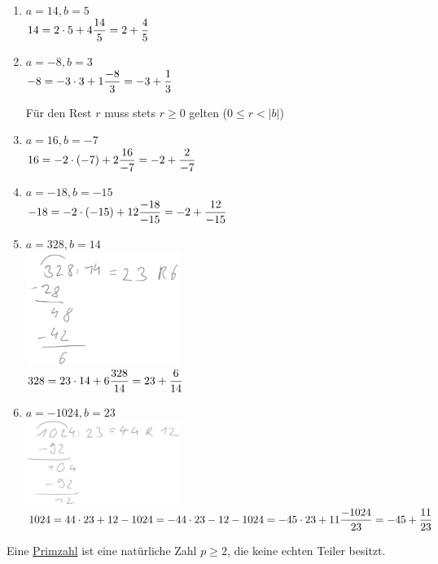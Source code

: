\Bsps
\begin{enumerate}
	\item $a=14,b=5$\\
	$14=2\cdot 5+4\hfil \dfrac{14}{5} = 2+\dfrac{4}{5}$
	
	\item $a=-8, b=3$\\
	$-8=-3\cdot 3+1\hfil \dfrac{-8}{3} = -3+\dfrac{1}{3}$
	
	\Beachte Für den Rest $r$ muss stets $r\ge 0$ gelten ($0\le r<|b|$)
	
	\item $a = 16, b=-7$\\
	$16=-2\cdot (-7)+2\hfil \dfrac{16}{-7} = -2+\dfrac{2}{-7}$
	
	\item $a = -18, b=-15$\\
	$-18=-2\cdot (-15)+12\hfil \dfrac{-18}{-15} = -2+\dfrac{12}{-15}$
	
	\item $a = 328, b=14$\\
	\includegraphics[width=5cm]{Bilder/71}\\
	$328=23\cdot 14 + 6\hfil \dfrac{328}{14} = 23+\dfrac{6}{14}$
	
	\item $a = -1024, b=23$\\
	\includegraphics[width=5cm]{Bilder/70}\\
	$1024=44\cdot 23 + 12\\
	-1024=-44\cdot 23 - 12\\
	-1024=-45\cdot 23 + 11\hfil \dfrac{-1024}{23} = -45+\dfrac{11}{23}$
\end{enumerate}
	
\Def Eine \ul{Primzahl} ist eine natürliche Zahl $p\ge 2$, die keine echten Teiler besitzt.


